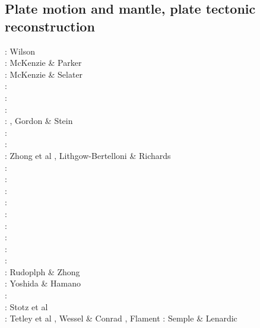 \subsection{Plate motion and mantle, plate tectonic reconstruction}

{\scriptsize
\nineteensixtysix: Wilson \cite{wils66}\\
\nineteensixtyseven: McKenzie \& Parker \cite{mcpa67}\\
\nineteenseventythree: McKenzie \& Selater \cite{mcse73}\\
\nineteenseventyfour: \cite{sosl74}\\
\nineteenseventyfive: \cite{harp75}\\
\nineteenninety: \cite{dega90}\\
\nineteenninetytwo: \cite{zieg92a}, Gordon \& Stein \cite{gost92}\\
\nineteenninetyfour: \cite{guto94}\\
\nineteenninetyseven: \cite{wean97b}\\
\nineteenninetyeight: Zhong et al \cite{zhgm98}, Lithgow-Bertelloni \& Richards \cite{liri98}\\
\nineteenninetynine: \cite{ribr99}\\
\twothousandone: \cite{yohk01}\\
\twothousandtwo: \cite{stoc02}\\
\twothousandthree: \cite{evan03}\cite{reta03}\\
\twothousandseven: \cite{zhzl07}\\
\twothousandnine: \cite{lizh09}\cite{vasv09}\cite{iabu09}\cite{scbs09}\\
\twothousandten: \cite{stto10}\cite{dega10}\\
\twothousandtwelve: \cite{huss12}\cite{gutz12}\cite{qumm12}\cite{holr12}\cite{dost12}\cite{shbs12}\\
\twothousandthirteen: \cite{mosq13}\cite{cost13}\\
\twothousandfourteen: Rudoplph \& Zhong \cite{ruzh14} \\
\twothousandfifteen: Yoshida \& Hamano \cite{yoha15}\\
\twothousandsixteen: \cite{pric16}\\
\twothousandseventeen: Stotz et al \cite{stid17}\\
\twothousandnineteen: Tetley et al \cite{tewg19}, Wessel \& Conrad \cite{weco19}, Flament \cite{flam19}
\twothousandtwenty: Semple \& Lenardic \cite{sele20}
}

